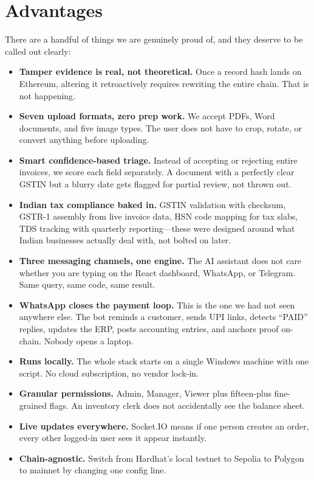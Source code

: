 \documentclass[conference]{IEEEtran}
\begin{document}
\section{Advantages}

There are a handful of things we are genuinely proud of, and they deserve to be called out clearly:
\begin{itemize}
    \item \textbf{Tamper evidence is real, not theoretical.} Once a record hash lands on Ethereum, altering it retroactively requires rewriting the entire chain. That is not happening.
    \item \textbf{Seven upload formats, zero prep work.} We accept PDFs, Word documents, and five image types. The user does not have to crop, rotate, or convert anything before uploading.
    \item \textbf{Smart confidence-based triage.} Instead of accepting or rejecting entire invoices, we score each field separately. A document with a perfectly clear GSTIN but a blurry date gets flagged for partial review, not thrown out.
    \item \textbf{Indian tax compliance baked in.} GSTIN validation with checksum, GSTR-1 assembly from live invoice data, HSN code mapping for tax slabs, TDS tracking with quarterly reporting---these were designed around what Indian businesses actually deal with, not bolted on later.
    \item \textbf{Three messaging channels, one engine.} The AI assistant does not care whether you are typing on the React dashboard, WhatsApp, or Telegram. Same query, same code, same result.
    \item \textbf{WhatsApp closes the payment loop.} This is the one we had not seen anywhere else. The bot reminds a customer, sends UPI links, detects ``PAID'' replies, updates the ERP, posts accounting entries, and anchors proof on-chain. Nobody opens a laptop.
    \item \textbf{Runs locally.} The whole stack starts on a single Windows machine with one script. No cloud subscription, no vendor lock-in.
    \item \textbf{Granular permissions.} Admin, Manager, Viewer plus fifteen-plus fine-grained flags. An inventory clerk does not accidentally see the balance sheet.
    \item \textbf{Live updates everywhere.} Socket.IO means if one person creates an order, every other logged-in user sees it appear instantly.
    \item \textbf{Chain-agnostic.} Switch from Hardhat's local testnet to Sepolia to Polygon to mainnet by changing one config line.
\end{itemize}
\end{document}
